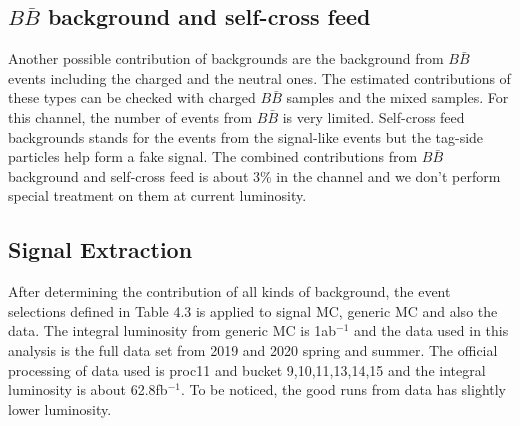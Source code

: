 \subsection{$B\bar{B}$ background and self-cross feed}
Another possible contribution of backgrounds are the background from $B\bar{B}$ events including the charged and the neutral ones. The estimated contributions of these types can be checked with charged $B\bar{B}$ samples and the mixed samples. For this channel, the number of events from  \textbf{$B\bar{B}$} is very limited. Self-cross feed backgrounds stands for the events from the signal-like events but the tag-side particles help form a fake signal. The combined contributions from $B\bar{B}$ background and self-cross feed is about 3\% in the channel and we don't perform special treatment on them at current luminosity.

\subsection{Signal Extraction}
After determining the contribution of all kinds of background, the event selections defined in Table 4.3 is applied to signal MC, generic MC and also the data. The integral luminosity from generic MC is 1ab$^{-1}$ and the data used in this analysis is the full data set from 2019 and 2020 spring and summer. 
The official processing of data used is proc11 and bucket 9,10,11,13,14,15 and the integral luminosity is about 62.8fb$^{-1}$. To be noticed, the good runs from data has slightly lower luminosity. 

